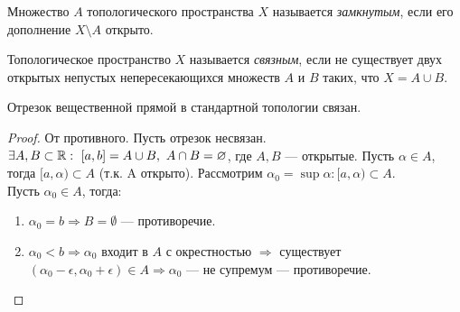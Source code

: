 \begin{definition}
    Множество $A$ топологического пространства $X$ называется \textit{замкнутым}, если его дополнение $X \setminus A$ открыто.
\end{definition}

\begin{definition}
    Топологическое пространство $X$ называется \textit{связным}, если не существует двух открытых непустых непересекающихся множеств $A$ и $B$ таких, что $X = A \cup B$.
\end{definition}

\begin{statement}
    Отрезок вещественной прямой в стандартной топологии связан.
\end{statement}
\begin{proof}
    От противного. Пусть отрезок несвязан. $\exists A, B \subset \mathbb{R}: \ [a, b] = A \cup B, \ A \cap B = \varnothing$, где $A, B$ — открытые. Пусть $\alpha \in A$, тогда $[a, \alpha) \subset A$ (т.к. A открыто). Рассмотрим $\alpha_0 = \sup{\alpha}: [a, \alpha) \subset A$. \\
    Пусть $\alpha_0 \in A$, тогда:
    \begin{enumerate}
        \item $\alpha_0 = b \Rightarrow B = \emptyset$ — противоречие.
        \item $\alpha_0 < b \Rightarrow \alpha_0$ входит в $A$ с окрестностью $\Rightarrow$ существует $(\alpha_0 - \epsilon, \alpha_0 + \epsilon) \in A \Rightarrow \alpha_0$ — не супремум — противоречие.
    \end{enumerate}
\end{proof}

